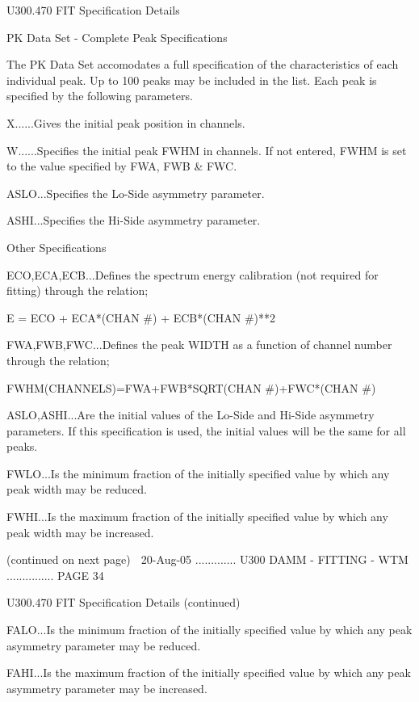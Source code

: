    U300.470  FIT Specification Details
 
                   PK  Data Set - Complete Peak Specifications
 
   The PK Data Set accomodates a full specification of the characteristics  of
   each  individual  peak.  Up  to 100 peaks may be included in the list. Each
   peak is specified by the following parameters.
 
   X......Gives the initial peak position in channels.
 
   W......Specifies the initial peak FWHM in channels. If  not  entered,  FWHM
          is set to the value specified by FWA, FWB & FWC.
 
   ASLO...Specifies the Lo-Side asymmetry parameter.
 
   ASHI...Specifies the Hi-Side asymmetry parameter.
 
                              Other Specifications
 
   ECO,ECA,ECB...Defines  the  spectrum  energy  calibration (not required for
          fitting) through the relation;
 
          E = ECO + ECA*(CHAN #) + ECB*(CHAN #)**2
 
   FWA,FWB,FWC...Defines the peak  WIDTH  as  a  function  of  channel  number
          through the relation;
 
          FWHM(CHANNELS)=FWA+FWB*SQRT(CHAN #)+FWC*(CHAN #)
 
   ASLO,ASHI...Are  the  initial  values  of the Lo-Side and Hi-Side asymmetry
          parameters. If this specification is used, the initial  values  will
          be the same for all peaks.
 
   FWLO...Is  the  minimum  fraction of the initially specified value by which
          any peak width may be reduced.
 
   FWHI...Is the maximum fraction of the initially specified  value  by  which
          any peak width may be increased.
 
                            (continued on next page)
    
   20-Aug-05 ............. U300  DAMM - FITTING - WTM ............... PAGE  34
 
   U300.470  FIT Specification Details (continued)
 
   FALO...Is  the  minimum  fraction of the initially specified value by which
          any peak asymmetry parameter may be reduced.
 
   FAHI...Is the maximum fraction of the initially specified  value  by  which
          any peak asymmetry parameter may be increased.
 
